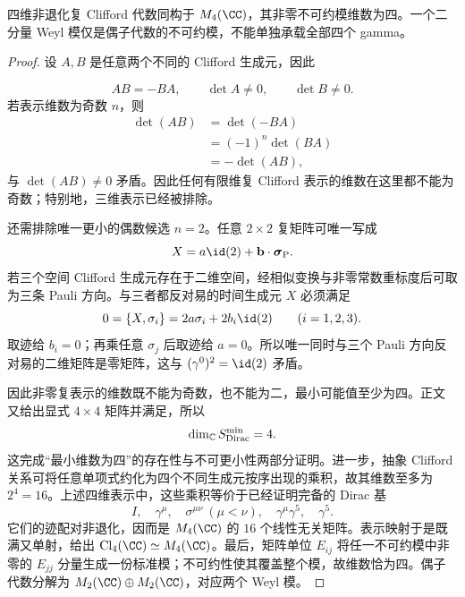 \begin{theorem}
四维非退化复 Clifford 代数同构于 $M_4(\CC)$，其非零不可约模维数为四。一个二分量 Weyl 模仅是偶子代数的不可约模，不能单独承载全部四个 gamma。
\end{theorem}
\begin{proof}
设 $A,B$ 是任意两个不同的 Clifford 生成元，因此

\begin{equation*}
 AB=-BA,
 \qquad
 \det A\neq0,
 \qquad
 \det B\neq0.
\end{equation*}
若表示维数为奇数 $n$，则
\begin{align*}
 \det(AB)
 &=\det(-BA)\\
 &=(-1)^n\det(BA)\\
 &=-\det(AB),
\end{align*}
与 $\det(AB)\neq0$ 矛盾。因此任何有限维复 Clifford 表示的维数在这里都不能为奇数；特别地，三维表示已经被排除。

还需排除唯一更小的偶数候选 $n=2$。任意 $2\times2$ 复矩阵可唯一写成
\begin{equation*}
 X=a\id(2)+\mathbf b\cdot\boldsymbol\sigma_{\rm P}.
\end{equation*}
若三个空间 Clifford 生成元存在于二维空间，经相似变换与非零常数重标度后可取为三条 Pauli 方向。与三者都反对易的时间生成元 $X$ 必须满足
\begin{equation*}
 0=\{X,\sigma_i\}
 =2a\sigma_i+2b_i\id(2)
 \qquad(i=1,2,3).
\end{equation*}
取迹给 $b_i=0$；再乘任意 $\sigma_j$ 后取迹给 $a=0$。所以唯一同时与三个 Pauli 方向反对易的二维矩阵是零矩阵，这与 $(\gamma^0)^2=\id(2)$ 矛盾。

因此非零复表示的维数既不能为奇数，也不能为二，最小可能值至少为四。正文 又给出显式 $4\times4$ 矩阵并满足，所以
\begin{equation*}
 \dim_{\mathbb C}S_{\rm Dirac}^{\rm min}=4.
\end{equation*}
这完成“最小维数为四”的存在性与不可更小性两部分证明。进一步，抽象 Clifford 关系可将任意单项式约化为四个不同生成元按序出现的乘积，故其维数至多为 $2^4=16$。上述四维表示中，这些乘积等价于已经证明完备的 Dirac 基
\[
I,\quad\gamma^\mu,\quad\sigma^{\mu\nu}\ (\mu<\nu),\quad\gamma^\mu\gamma^5,\quad\gamma^5.
\]
它们的迹配对非退化，因而是 $M_4(\CC)$ 的 $16$ 个线性无关矩阵。表示映射于是既满又单射，给出 $\mathrm{Cl}_4(\CC)\simeq M_4(\CC)$。最后，矩阵单位 $E_{ij}$ 将任一不可约模中非零的 $E_{jj}$ 分量生成一份标准模；不可约性使其覆盖整个模，故维数恰为四。偶子代数分解为 $M_2(\CC)\oplus M_2(\CC)$，对应两个 Weyl 模。
\end{proof}

